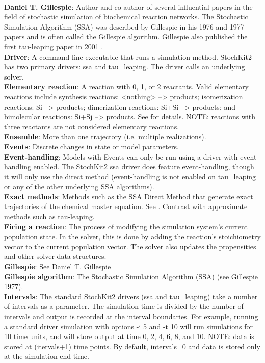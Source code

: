 \documentclass[11pt,letterpaper]{article}
\begin{document}
\\\textbf{Daniel T. Gillespie}: Author and co-author of several influential papers in the field of stochastic simulation of biochemical reaction networks.  The Stochastic Simulation Algorithm (SSA) was described by Gillespie in his 1976 and 1977 papers and is often called the Gillespie algorithm.  Gillespie also published the first tau-leaping paper in 2001 \cite{Gillespie2001}.
\\\textbf{Driver}: A command-line executable that runs a simulation method.  StochKit2 has two primary drivers: ssa and tau\_leaping.  The driver calls an underlying solver.
\\\textbf{Elementary reaction}: A reaction with 0, 1, or 2 reactants.  Valid elementary reactions include synthesis reactions: <nothing> --> products; isomerization reactions: Si --> products; dimerization reactions: Si+Si --> products; and bimolecular reactions: Si+Sj --> products. See \cite{Gillespie1977} for details.  NOTE: reactions with three reactants are not considered elementary reactions. 
\\\textbf{Ensemble}: More than one trajectory (i.e. multiple realizations).
\\\textbf{Events}: Discrete changes in state or model parameters.
\\\textbf{Event-handling}: Models with Events can only be run using a driver with event-handling enabled.  The StochKit2 ssa driver does feature event-handling, though it will only use the direct method (event-handling is not enabled on tau\_leaping or any of the other underlying SSA algorithms).
\\\textbf{Exact methods}: Methods such as the SSA Direct Method that generate exact trajectories of the chemical master equation.  See \cite{Gillespie1977}.  Contrast with approximate methods such as tau-leaping.
\\\textbf{Firing a reaction}: The process of modifying the simulation system's current population state.  In the solver, this is done by adding the reaction's stoichiometry vector to the current population vector.  The solver also updates the propensities and other solver data structures.
\\\textbf{Gillespie}: See Daniel T. Gillespie
\\\textbf{Gillespie algorithm}: The Stochastic Simulation Algorithm (SSA) (see Gillespie 1977).  
\\\textbf{Intervals}: The standard StochKit2 drivers (ssa and tau\_leaping) take a number of intervals as a parameter.  The simulation time is divided by the number of intervals and output is recorded at the interval boundaries.  For example, running a standard driver simulation with options -i 5 and -t 10 will run simulations for 10 time units, and will store output at time 0, 2, 4, 6, 8, and 10.  NOTE: data is stored at (itervals+1) time points.  By default, intervals=0 and data is stored only at the simulation end time.
\end{document}
